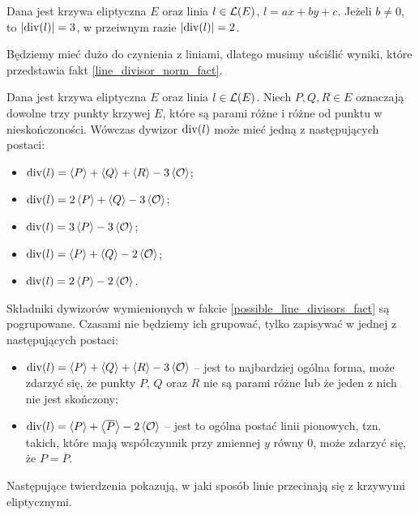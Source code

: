 \begin{fact}\label{line_divisor_norm_fact}
Dana jest krzywa eliptyczna $E$
oraz linia $l \in \mathcal{L}(E)$, $l = ax + by + c$.
Jeżeli $b \neq 0$, to $\lvert\operatorname{div}(l)\rvert = 3$,
w przeiwnym razie $\lvert\operatorname{div}(l)\rvert = 2$.
\end{fact}

Będziemy mieć dużo do czynienia z liniami,
dlatego musimy uściślić wyniki,
które przedstawia fakt \ref{line_divisor_norm_fact}.

\begin{fact}\label{possible_line_divisors_fact}
Dana jest krzywa eliptyczna $E$
oraz linia $l \in \mathcal{L}(E)$.
Niech $P, Q, R \in E$ oznaczają dowolne trzy punkty krzywej $E$,
które są parami różne i różne od punktu w nieskończoności.
Wówczas dywizor $\operatorname{div}(l)$ może mieć jedną z następujących postaci:
\begin{itemize}
\item $\operatorname{div}(l) = \left\langle P\right\rangle + \left\langle Q\right\rangle + \left\langle R\right\rangle - 3\left\langle\mathcal{O}\right\rangle$;
\item $\operatorname{div}(l) = 2\left\langle P\right\rangle + \left\langle Q\right\rangle - 3\left\langle\mathcal{O}\right\rangle$;
\item $\operatorname{div}(l) = 3\left\langle P\right\rangle - 3\left\langle\mathcal{O}\right\rangle$;
\item $\operatorname{div}(l) = \left\langle P\right\rangle + \left\langle Q\right\rangle - 2\left\langle\mathcal{O}\right\rangle$;
\item $\operatorname{div}(l) = 2\left\langle P\right\rangle - 2\left\langle\mathcal{O}\right\rangle$.
\end{itemize}
\end{fact}

\begin{remark}\label{possible_line_divisors_remark}
Składniki dywizorów wymienionych w fakcie \ref{possible_line_divisors_fact}
są pogrupowane. Czasami nie będziemy ich grupować,
tylko zapisywać w jednej z następujących postaci:
\begin{itemize}
\item $\operatorname{div}(l) = \left\langle P\right\rangle + \left\langle Q\right\rangle + \left\langle R\right\rangle - 3\left\langle\mathcal{O}\right\rangle$ --
jest to najbardziej ogólna forma,
może zdarzyć się, że punkty $P$, $Q$ oraz $R$ nie są parami różne
lub że jeden z nich nie jest skończony;
\item $\operatorname{div}(l) = \left\langle P\right\rangle + \left\langle\overline{P}\right\rangle - 2\left\langle\mathcal{O}\right\rangle$ --
jest to ogólna postać linii pionowych,
tzn. takich, które mają współczynnik przy zmiennej $y$ równy $0$,
może zdarzyć się, że $P = \overline{P}$.
\end{itemize}
\end{remark}

Następujące twierdzenia pokazują,
w jaki sposób linie przecinają się z krzywymi eliptycznymi.

